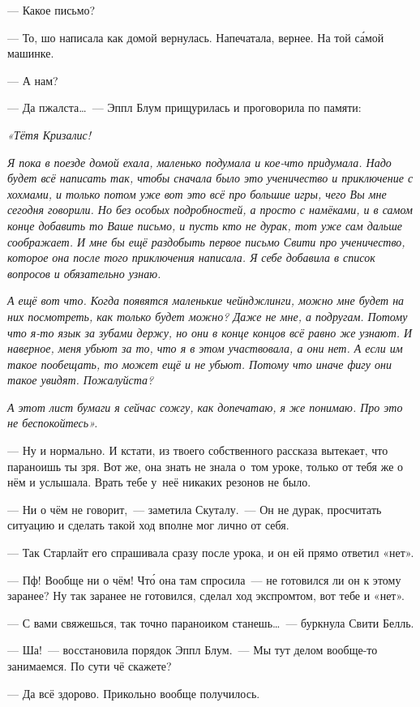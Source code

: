 \documentclass[fontsize=11pt,a5paper,titlepage=firstcover]{scrbook}
\begin{document}
--- Какое письмо?

--- То, шо написала как домой вернулась. Напечатала, вернее. На той са́мой машинке.

--- А нам?

--- Да пжалста{\ldots}~--- Эппл Блум прищурилась и проговорила по памяти:

\emph{«Тётя Кризалис!}

\emph{Я пока в поезде домой ехала, маленько подумала и кое-что придумала. Надо будет всё написать так, чтобы сначала было это ученичество и приключение с хохмами, и только потом уже вот это всё про большие игры, чего Вы мне сегодня говорили. Но без особых подробностей, а просто с намёками, и в самом конце добавить то Ваше письмо, и пусть кто не дурак, тот уже сам дальше соображает. И мне бы ещё раздобыть первое письмо Свити про ученичество, которое она после того приключения написала. Я себе добавила в список вопросов и обязательно узнаю.}

\emph{А ещё вот что. Когда появятся маленькие чейнджлинги, можно мне будет на них посмотреть, как только будет можно? Даже не мне, а подругам. Потому что я-то язык за зубами держу, но они в конце концов всё равно же узнают. И наверное, меня убьют за то, что я в этом участвовала, а они нет. А если им такое пообещать, то может ещё и не убьют. Потому что иначе фигу они такое увидят. Пожалуйста?}

\emph{А этот лист бумаги я сейчас сожгу, как допечатаю, я же понимаю. Про это не беспокойтесь».}

--- Ну и нормально. И кстати, из твоего собственного рассказа вытекает, что параноишь ты зря. Вот же, она знать не знала о~том уроке, только от тебя же о нём и услышала. Врать тебе у~неё никаких резонов не было.

--- Ни о чём не говорит,~--- заметила Скуталу.~--- Он не дурак, просчитать ситуацию и сделать такой ход вполне мог лично от себя.

--- Так Старлайт его спрашивала сразу после урока, и он ей прямо ответил «нет».

--- Пф! Вообще ни о чём! Что́ она там спросила~--- не готовился ли он к этому заранее? Ну так заранее не готовился, сделал ход экспромтом, вот тебе и «нет».

--- С вами свяжешься, так точно параноиком станешь{\ldots}~--- буркнула Свити Белль.

--- Ша!~--- восстановила порядок Эппл Блум.~--- Мы тут делом вообще-то занимаемся. По сути чё скажете?

--- Да всё здорово. Прикольно вообще получилось.
\end{document}
